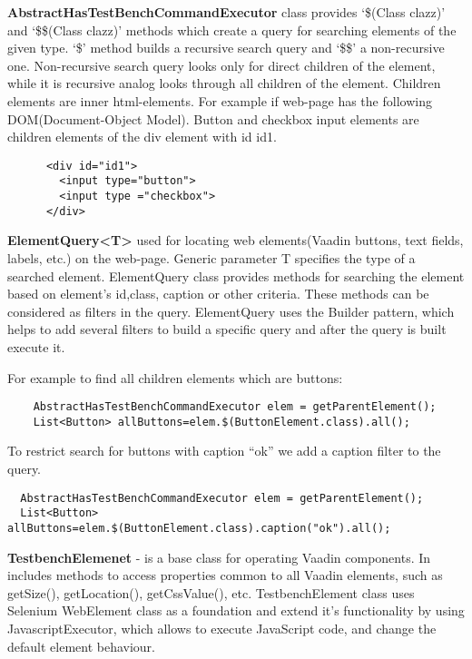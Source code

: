 \textbf{AbstractHasTestBenchCommandExecutor} class provides  `\$(Class clazz)'
and `\$\$(Class clazz)' methods which create a query for searching elements of
the given type.
 `\$' method builds a recursive search query and `\$\$' a non-recursive one.
 Non-recursive search query looks only for direct children of the element, while
 it is recursive analog looks through all children of the element. Children
 elements are inner html-elements.
   For example if web-page has the following DOM(Document-Object Model). 
   Button and checkbox input elements are children elements of the div element with id id1.
  \lstset{language=HTML}
    \begin{lstlisting}
      <div id="id1">
        <input type="button">
        <input type ="checkbox">
      </div>
  \end{lstlisting}
  
  
\textbf{ElementQuery<T>} used for locating web elements(Vaadin buttons, text
fields, labels, etc.) on the web-page.
 Generic parameter T specifies the type of a searched element. 
 ElementQuery class provides methods for searching the element based on
 element's id,class, caption or other criteria. These methods can be considered as filters in the query.
 ElementQuery uses the Builder pattern, which helps to add several filters to build a specific query and after
 the query is built execute it.

For example to find all children elements which are buttons:
  \lstset{language=Java}
    \begin{lstlisting}
    AbstractHasTestBenchCommandExecutor elem = getParentElement();
    List<Button> allButtons=elem.$(ButtonElement.class).all();
  \end{lstlisting}
  
To restrict search for buttons with caption ``ok'' we add a caption filter to the query.
  \lstset{style=a1listing}
  \begin{lstlisting}
  AbstractHasTestBenchCommandExecutor elem = getParentElement();
  List<Button> allButtons=elem.$(ButtonElement.class).caption("ok").all();
  \end{lstlisting}
  
\textbf{TestbenchElemenet} - is a base class for operating Vaadin components. In
includes methods to access properties common to all Vaadin elements, such as getSize(), getLocation(), getCssValue(), etc.
TestbenchElement class uses Selenium WebElement class as a foundation and extend
it's functionality by using JavascriptExecutor,
which allows to execute JavaScript code, and change the default element behaviour.

